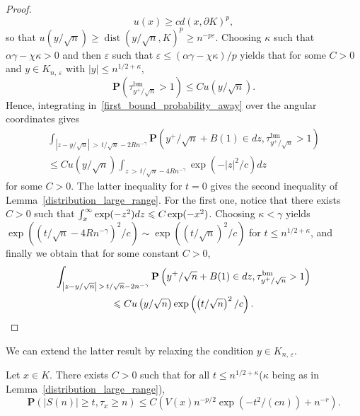 \documentclass[AHL,Unicode,longabstracts,published]{cedram}
\DeclareMathOperator{\bm}{bm}
\DeclareMathOperator{\dist}{dist}
\newcommand{\pr}{\mathbf{P}}
\renewcommand{\epsilon}{\varepsilon}
\renewcommand{\leq}{\leqslant}
\renewcommand{\geq}{\geqslant}
\begin{document}
\begin{proof}
\begin{equation}
u(x)\geq cd(x,\partial K)^{p},
\end{equation}
so that $u(y/\sqrt{n})\geq \dist(y/\sqrt{n},{K})^{p}\geq n^{-p\epsilon}$. Choosing $\kappa$ such that $\alpha\gamma-\chi\kappa>0$ and then $\epsilon$ such that $\epsilon\leq (\alpha\gamma-\chi\kappa)/p$ yields that for some $C>0$ and $y\in{K}_{n,\,\epsilon}$ with $| y|\leq n^{1/2+\kappa}$,
\[
\pr\left(\tau^{\bm}_{y^{+}/\sqrt{n}}>1\right)\leq Cu\left(y/\sqrt{n}\right).
\]
Hence, integrating in~\eqref{first_bound_probability_away} over the angular coordinates gives
\begin{multline*}
\int_{\left|z-y/\sqrt{n}\right|\,>\,t/\sqrt{n}-2Rn^{-\gamma}}\pr\left(y^{+}/\sqrt{n}+B(1)\in dz,\tau^{\bm}_{y^{+}/\sqrt{n}}>1\right)\\
\leq Cu\left(y/\sqrt{n}\right)\int_{z\,>\,t/\sqrt{n}-4Rn^{-\gamma}}\exp\left(-|z|^{2}/c\right)dz
\end{multline*}
for some $C>0$. The latter inequality for $t=0$ gives the second inequality of Lemma~\ref{distribution_large_range}. For the first one, notice that there exists $C>0$ such that $\int_{x}^{\infty}\exp(-z^{2})dz\linebreak\leq C\exp(-x^{2})$. Choosing $\kappa<\gamma$ yields $\exp((t/\sqrt{n}-4Rn^{-\gamma})^{2}/c)\sim \exp((t/\sqrt{n})^{2}/c)$ for $t\leq n^{1/2+\kappa}$, and finally we obtain that for some constant $C>0$,
\begin{multline*}
\int_{\left|z-y/\sqrt{n}\right|\,>\,t/\sqrt{n}-2n^{-\gamma}}\pr\left(y^{+}/\sqrt{n}+B(1)\in dz,\tau^{\bm}_{y^{+}/\sqrt{n}}>1\right)\\
\leq C u\left(y/\sqrt{n}\right)\exp\left(\left(t/\sqrt{n}\right)^{2}/c\right).\qedhere
\end{multline*}
\end{proof}

We can extend the latter result by relaxing the condition $y\in{K}_{n,\,\epsilon}$.

\begin{lemm}\label{boundAwayFixedX}
Let $x\in{K}$. There exists $C>0$ such that for all $t\leq n^{1/2+\kappa}$\linebreak($\kappa$ being as in Lemma~\ref{distribution_large_range}),
\[
\pr\left(|S(n)| \geq t, \tau_{x}\geq n\right)\leq C\left(V(x)n^{-p/2}\exp\left(-t^{2}/(cn)\right)+ n^{-r}\right).
\]
\end{lemm}
\end{document}
